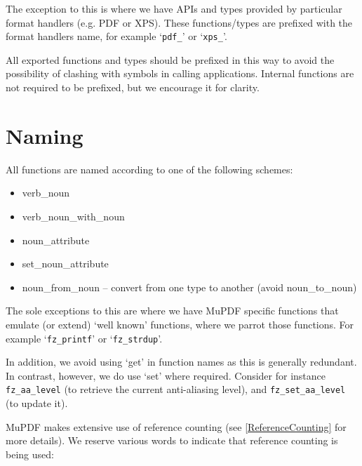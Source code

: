 \documentclass[oneside]{book}
\newcommand{\rjwref}[1] {\autoref{#1} \nameref{#1}}
\begin{document}
The exception to this is where we have APIs and types provided by particular format handlers (e.g. PDF or XPS). These functions/types are prefixed with the format handlers name, for example `\texttt{pdf\_}' or `\texttt{xps\_}'.

All exported functions and types should be prefixed in this way to avoid the possibility of clashing with symbols in calling applications. Internal functions are not required to be prefixed, but we encourage it for clarity.

\section{Naming}

All functions are named according to one of the following schemes:

\begin{itemize}
\item verb\_noun
\item verb\_noun\_with\_noun
\item noun\_attribute
\item set\_noun\_attribute
\item noun\_from\_noun -- convert from one type to another (avoid noun\_to\_noun)
\end{itemize}

The sole exceptions to this are where we have MuPDF specific functions that emulate (or extend) `well known' functions, where we parrot those functions. For example `\texttt{fz\_printf}' or `\texttt{fz\_strdup}'.

In addition, we avoid using `get' in function names as this is generally redundant. In contrast, however, we do use `set' where required. Consider for instance \texttt{fz\_aa\_level} (to retrieve the current anti-aliasing level), and \texttt{fz\_set\_aa\_level} (to update it).

MuPDF makes extensive use of reference counting (see \rjwref{ReferenceCounting} for more details). We reserve various words to indicate that reference counting is being used:
\end{document}
